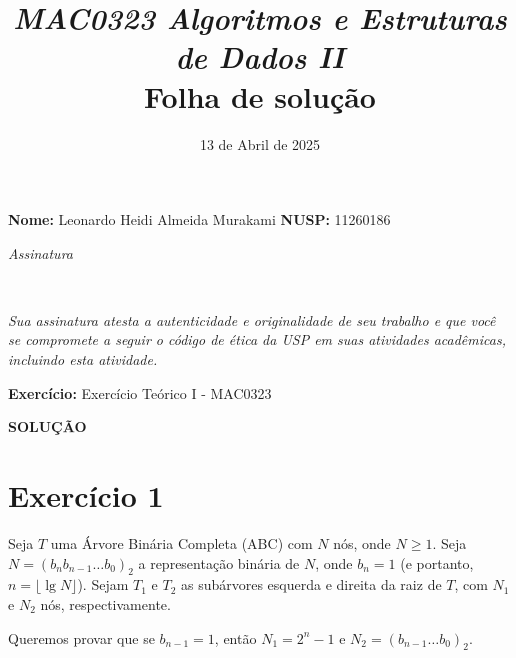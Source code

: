 \documentclass[11pt,reqno,a4paper]{amsart}
\title{\textsl{
    MAC0323 Algoritmos e Estruturas de Dados II}\\\vspace{3\jot}
  Folha de solução}
\author[MAC0323 Folha de solução]{} %
\date{13 de Abril de 2025} %
\def\Assin#1{\noindent\textit{Assinatura}\strut\\%
\framebox[\textwidth]{\phantom{\vrule height#1}}}
\theoremstyle{prova_style}
\DeclareMathOperator{\lgop}{lg}
\newcommand{\lgfn}[1]{\lgop #1}
\begin{document}
\parindent=0pt

\maketitle
\thispagestyle{empty} 
\pagestyle{plain}
\onehalfspace

\textbf{Nome:} Leonardo Heidi Almeida Murakami\enspace \hfill \enspace
\textbf{NUSP:} 11260186\enspace\hfill

\medskip
\Assin{1cm}

\medskip \textit{Sua assinatura atesta a autenticidade e
  originalidade de seu trabalho e que você se compromete a seguir o
  código de ética da USP em suas atividades acadêmicas, incluindo esta
  atividade.}

\bigskip
\textbf{Exercício:} Exercício Teórico I - MAC0323\enspace\hfill\enspace

\bigskip
\noindent\textbf{SOLUÇÃO}

\section{Exercício 1}
Seja $T$ uma Árvore Binária Completa (ABC) com $N$ nós, onde $N \geq 1$. Seja $N = (b_n b_{n-1} \dots b_0)_2$ a representação binária de $N$, onde $b_n=1$ (e portanto, $n = \lfloor \lgfn N \rfloor$). Sejam $T_1$ e $T_2$ as subárvores esquerda e direita da raiz de $T$, com $N_1$ e $N_2$ nós, respectivamente.

Queremos provar que se $b_{n-1}=1$, então $N_1 = 2^n - 1$ e $N_2 = (b_{n-1}\dots b_0)_2$.
\end{document}
